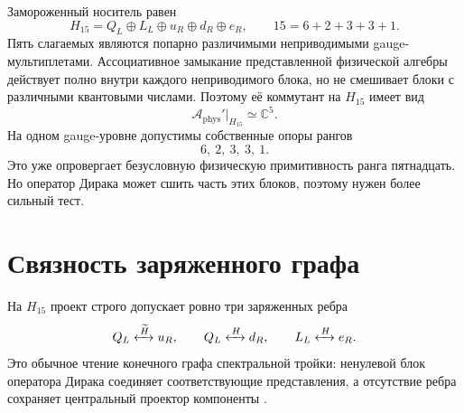 Замороженный носитель равен
\begin{equation}
 H_{15}=Q_L\oplus L_L\oplus u_R\oplus d_R\oplus e_R,
 \qquad
 15=6+2+3+3+1.
 \label{eq:v6-minimal-support-h15}
\end{equation}
Пять слагаемых являются попарно различимыми неприводимыми
gauge-мультиплетами. Ассоциативное замыкание представленной физической
алгебры действует полно внутри каждого неприводимого блока, но не
смешивает блоки с различными квантовыми числами. Поэтому её коммутант на
$H_{15}$ имеет вид
\begin{equation}
 \mathcal A_{\mathrm{phys}}'\big|_{H_{15}}
 \simeq \mathbb C^5.
\end{equation}
На одном gauge-уровне допустимы собственные опоры рангов
\begin{equation}
 6,\ 2,\ 3,\ 3,\ 1.
\end{equation}
Это уже опровергает безусловную физическую примитивность ранга пятнадцать.
Но оператор Дирака может сшить часть этих блоков, поэтому нужен более
сильный тест.

\section{Связность заряженного графа}

На $H_{15}$ проект строго допускает ровно три заряженных ребра
\begin{equation}
 Q_L\xleftrightarrow{\,\widetilde H\,}u_R,
 \qquad
 Q_L\xleftrightarrow{\,H\,}d_R,
 \qquad
 L_L\xleftrightarrow{\,H\,}e_R.
 \label{eq:v6-minimal-support-charged-edges}
\end{equation}
Это обычное чтение конечного графа спектральной тройки: ненулевой блок
оператора Дирака соединяет соответствующие представления, а отсутствие
ребра сохраняет центральный проектор компоненты
\cite{minimal-support-krajewski1998,
minimal-support-chamseddine-connes-marcolli2007}.


